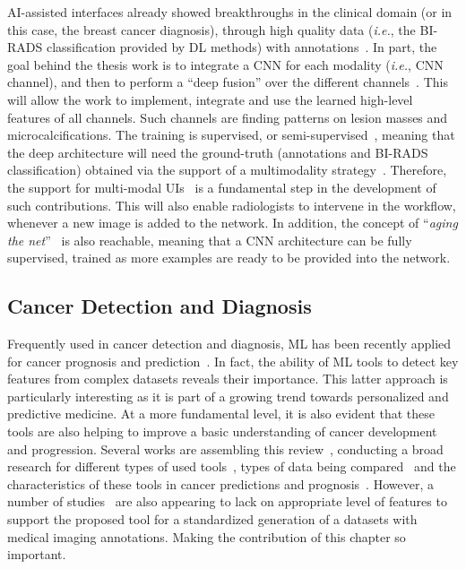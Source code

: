 \ac{AI}-assisted interfaces already showed breakthroughs in the clinical domain (or in this case, the breast cancer diagnosis), through high quality data ({\it i.e.}, the \ac{BI-RADS} classification provided by \ac{DL} methods) with annotations~\cite{https://doi.org/10.13140/rg.2.2.25412.68486}.
In part, the goal behind the thesis work is to integrate a \ac{CNN} for each modality ({\it i.e.}, \ac{CNN} channel), and then to perform a ``deep fusion'' over the different channels~\cite{liu2019sdfn, wei2019medical}.
This will allow the work to implement, integrate and use the learned high-level features of all channels.
Such channels are finding patterns on lesion masses and microcalcifications.
The training is  supervised, or semi-supervised~\cite{philbrick2019ril, zhao2019data, zhou2019collaborative}, meaning that the deep architecture will need the ground-truth (annotations and \ac{BI-RADS} classification) obtained via the support of a multimodality strategy~\cite{huang2019diagnosis, soffer2019convolutional}.
Therefore, the support for multi-modal \acp{UI}~\cite{gotz2019mitk, wels2019general} is a fundamental step in the development of such contributions.
This will also enable radiologists to intervene in the workflow, whenever a new image is added to the network.
In addition, the concept of  ``{\it aging the net}''~\cite{smailagic2019medal} is also reachable, meaning that a \ac{CNN} architecture can be fully supervised, trained as more examples are ready to be provided into the network.

\subsection{Cancer Detection and Diagnosis}
\label{sec:sec004002002}

Frequently used in cancer detection and diagnosis, \ac{ML} has been recently applied for cancer prognosis and prediction~\cite{KOUROU20158}.
In fact, the ability of \ac{ML} tools to detect key features from complex datasets reveals their importance.
This latter approach is particularly interesting as it is part of a growing trend towards personalized and predictive medicine.
At a more fundamental level, it is also evident that these tools are also helping to improve a basic understanding of cancer development and progression.
Several works are assembling this review~\cite{https://doi.org/10.1111/cen.12731, antonanzas2015some, hood2011predictive}, conducting a broad research for different types of used tools~\cite{Huang_2017_CVPR, 8515234, 10.1007/978-3-030-00934-2_99}, types of data being compared~\cite{MOREIRA2012236, 7813261, shen2019deep} and the characteristics of these tools in cancer predictions and prognosis~\cite{KOUROU20158, hood2011predictive}.
However, a number of studies~\cite{Cai:2019:HTC:3290605.3300234, 10.1167/tvst.8.6.40} are also appearing to lack on appropriate level of features to support the proposed tool for a standardized generation of a datasets with medical imaging annotations.
Making the contribution of this chapter so important.

